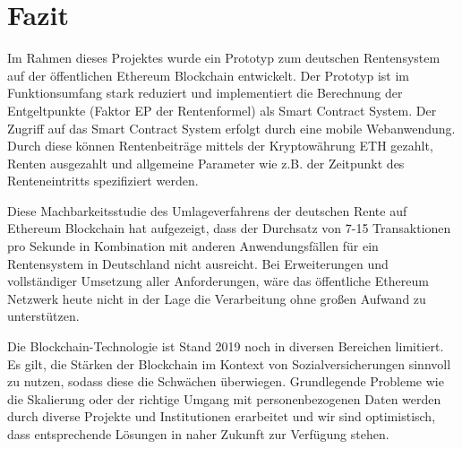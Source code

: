 \section{Fazit}
Im Rahmen dieses Projektes wurde ein Prototyp zum deutschen Rentensystem auf der öffentlichen Ethereum Blockchain entwickelt. Der Prototyp ist im Funktionsumfang stark reduziert und implementiert die Berechnung der Entgeltpunkte (Faktor EP der Rentenformel) als Smart Contract System. Der Zugriff auf das Smart Contract System erfolgt durch eine mobile Webanwendung. Durch diese können Rentenbeiträge mittels der Kryptowährung ETH gezahlt, Renten ausgezahlt und allgemeine Parameter wie z.B. der Zeitpunkt des Renteneintritts spezifiziert werden.

Diese Machbarkeitsstudie des Umlageverfahrens der deutschen Rente auf Ethereum Blockchain hat aufgezeigt, dass der Durchsatz von 7-15 Transaktionen pro Sekunde in Kombination mit anderen Anwendungsfällen für ein Rentensystem in Deutschland nicht ausreicht. Bei Erweiterungen und vollständiger Umsetzung aller Anforderungen, wäre das öffentliche Ethereum Netzwerk heute nicht in der Lage die Verarbeitung ohne großen Aufwand zu unterstützen.

Die Blockchain-Technologie ist Stand 2019 noch in diversen Bereichen limitiert. Es gilt, die Stärken der Blockchain im Kontext von Sozialversicherungen sinnvoll zu nutzen, sodass diese die Schwächen überwiegen. Grundlegende Probleme wie die Skalierung oder der richtige Umgang mit personenbezogenen Daten werden durch diverse Projekte und Institutionen erarbeitet und wir sind optimistisch, dass entsprechende Lösungen in naher Zukunft zur Verfügung stehen.



